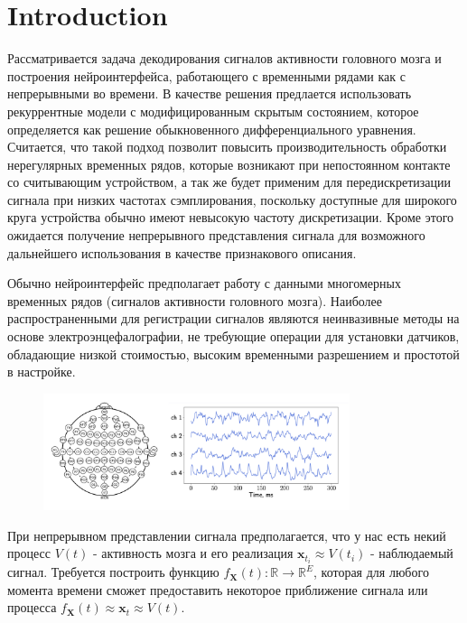 \newcommand{\vect}[1]{\textbf{#1}}

\section{Introduction}

Рассматривается задача декодирования сигналов активности головного мозга и построения нейроинтерфейса, работающего с временными рядами как с непрерывными во времени. В качестве решения предлается использовать рекуррентные модели с модифицированным скрытым состоянием, которое определяется как решение обыкновенного дифференциального уравнения. Считается, что такой подход позволит повысить производительность обработки нерегулярных временных рядов, которые возникают при непостоянном контакте со считывающим устройством, а так же будет применим для передискретизации сигнала при низких частотах сэмплирования, поскольку доступные для широкого круга устройства обычно имеют невысокую частоту дискретизации. Кроме этого ожидается получение непрерывного представления сигнала для возможного дальнейшего использования в качестве признакового описания.  

Обычно нейроинтерфейс предполагает работу с данными многомерных временных рядов (сигналов активности головного мозга). Наиболее распространенными для регистрации сигналов являются неинвазивные методы на основе электроэнцефалографии, не требующие операции для установки датчиков, обладающие низкой стоимостью, высоким временными разрешением и простотой в настройке. 
\begin{figure}[!h]
	\centering
	\includegraphics[width=0.8\textwidth]{chapters/varenik1/electodes-signal.png}
\end{figure}

При непрерывном представлении сигнала предполагается, что у нас есть некий процесс $V(t)$ - активность мозга и его реализация $\vect x_{t_i} \approx V(t_i)$ - наблюдаемый сигнал. Требуется построить функцию $f_{\vect X}(t): \mathbb{R}\to \mathbb{R}^E$, которая для любого момента времени сможет предоставить некоторое приближение сигнала или процесса $f_{\vect X}(t) \approx \vect x_t \approx V(t)$.

